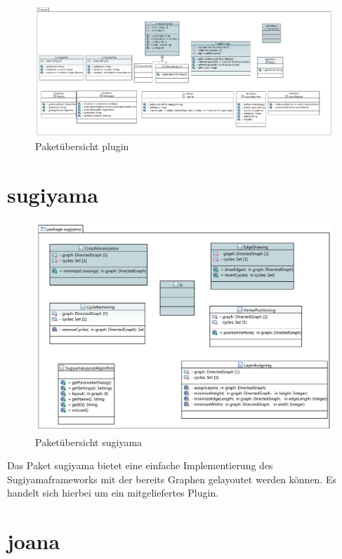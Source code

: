 \begin{figure}[hb]
  \centering
  \includegraphics[width=380pt]{resourcen/plugin.pdf}
  \caption{Paketübersicht plugin}
  \label{fig:packge_plugin}
\end{figure}

\newpage

\section{sugiyama}

\begin{figure}[hb]
  \centering
  \includegraphics[width=380pt]{resourcen/sugiyama.pdf}
  \caption{Paketübersicht sugiyama}
  \label{fig:packge_sugiyama}
\end{figure}

Das Paket sugiyama bietet eine einfache Implementierung des Sugiyamaframeworks mit der bereits Graphen gelayoutet werden können. Es handelt sich hierbei um ein mitgeliefertes Plugin.

\newpage

\section{joana}


